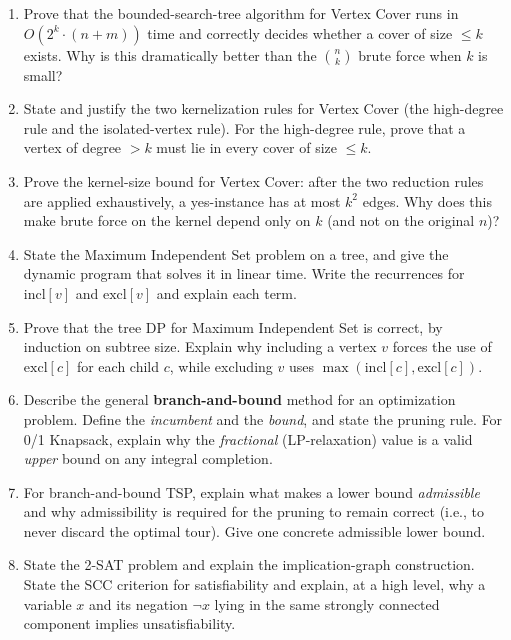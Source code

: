 \documentclass[11pt]{article}
\begin{document}
\begin{enumerate}[label=\textbf{A\arabic*.}, leftmargin=2.2em]
\item Prove that the bounded-search-tree algorithm for Vertex Cover runs in
$O(2^k \cdot (n+m))$ time and correctly decides whether a cover of size $\le k$
exists. Why is this dramatically better than the $\binom{n}{k}$ brute force when
$k$ is small?

\item State and justify the two kernelization rules for Vertex Cover (the
high-degree rule and the isolated-vertex rule). For the high-degree rule, prove
that a vertex of degree $> k$ must lie in every cover of size $\le k$.

\item Prove the kernel-size bound for Vertex Cover: after the two reduction
rules are applied exhaustively, a yes-instance has at most $k^2$ edges. Why does
this make brute force on the kernel depend only on $k$ (and not on the original
$n$)?

\item State the Maximum Independent Set problem on a tree, and give the dynamic
program that solves it in linear time. Write the recurrences for
$\mathrm{incl}[v]$ and $\mathrm{excl}[v]$ and explain each term.

\item Prove that the tree DP for Maximum Independent Set is correct, by
induction on subtree size. Explain why including a vertex $v$ forces the use of
$\mathrm{excl}[c]$ for each child $c$, while excluding $v$ uses
$\max(\mathrm{incl}[c], \mathrm{excl}[c])$.

\item Describe the general \textbf{branch-and-bound} method for an optimization
problem. Define the \emph{incumbent} and the \emph{bound}, and state the pruning
rule. For 0/1 Knapsack, explain why the \emph{fractional} (LP-relaxation) value
is a valid \emph{upper} bound on any integral completion.

\item For branch-and-bound TSP, explain what makes a lower bound
\emph{admissible} and why admissibility is required for the pruning to remain
correct (i.e., to never discard the optimal tour). Give one concrete admissible
lower bound.

\item State the 2-SAT problem and explain the implication-graph construction.
State the SCC criterion for satisfiability and explain, at a high level, why a
variable $x$ and its negation $\lnot x$ lying in the same strongly connected
component implies unsatisfiability.

\end{enumerate}
\end{document}
